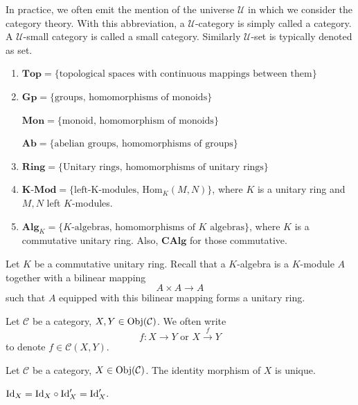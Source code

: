 \begin{remark}
    In practice, we often emit the mention of the universe $\mathcal{U}$ in which we consider the category theory. With this abbreviation, a $\mathcal{U}$-category is simply called a category. A $\mathcal{U}$-small category is called a small category. Similarly $\mathcal{U}$-set is typically denoted as set.
\end{remark}
\begin{notationenv}
    \quad
\begin{enumerate}[label=(\arabic*)]
    \item $\mathbf{Top} = \{\text{topological spaces with continuous mappings between them}\}$
    \item $\mathbf{Gp} = \{\text{groups, homomorphisms of monoids}\}$
    
        $\mathbf{Mon} = \{\text{monoid, homomorphism of monoids}\}$

        $\mathbf{Ab}= \{\text{abelian groups, homomorphisms of groups}\}$
    \item $\mathbf{Ring} = \{\text{Unitary rings, homomorphisms of unitary rings}\}$
    \item $\mathbf{K}\text{-}\mathbf{Mod} = \{\text{left-K-modules, }\mathrm{Hom}_K(M,N)\}$, where $K$ is a unitary ring and $M,N$ left $K$-modules.
    \item $\mathbf{Alg}_K=\{K\text{-algebras, homomorphisms of }K\text{ algebras}\}$, where $K$ is a commutative unitary ring.
        Also, $\mathbf{CAlg}$ for those commutative.
\end{enumerate}
\end{notationenv}
\begin{remark}
    Let $K$ be a commutative unitary ring. Recall that a $K$-algebra is a $K$-module $A$ together with a bilinear mapping $$A\times A\rightarrow A$$ such that $A$ equipped with this bilinear mapping forms a unitary ring.
\end{remark}
\begin{notationenv}
    Let $\mathcal{C}$ be a category, $X,Y\in \mathrm{Obj}(\mathcal{C})$. We often write 
    $$ f: X\rightarrow Y \text{ or } X\overset{f}{\longrightarrow} Y$$
    to denote $f\in \mathcal{C}(X,Y)$.
\end{notationenv}
\begin{propositionenv}
    Let $\mathcal{C}$ be a category, $X\in \mathrm{Obj}(\mathcal{C})$. The identity morphism of $X$ is unique.
\end{propositionenv}
\begin{proofenv}
    $ \mathrm{Id}_X = \mathrm{Id}_X \circ \mathrm{Id}_X' = \mathrm{Id}_X'.$
\end{proofenv}
